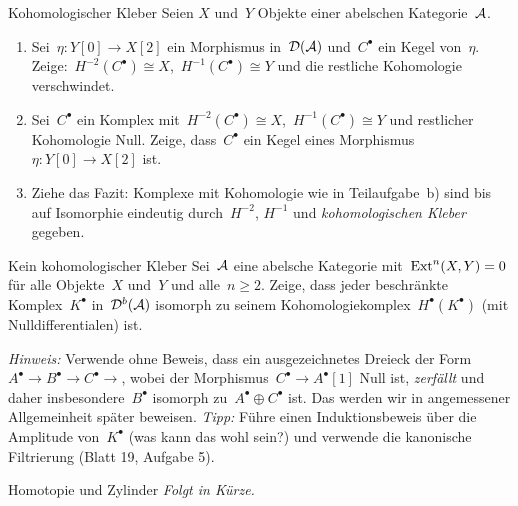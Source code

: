 \documentclass{uebblatt}
\begin{document}
\begin{aufgabe}{Kohomologischer Kleber}
Seien $X$ und~$Y$ Objekte einer abelschen Kategorie~$\mathcal{A}$.
\begin{enumerate}
\item Sei~$\eta : Y[0] \to X[2]$ ein Morphismus in~$\mathcal{D}(\mathcal{A})$ und~$C^\bullet$ ein Kegel
von~$\eta$. \\ Zeige:~$H^{-2}(C^\bullet) \cong X$,~$H^{-1}(C^\bullet)
\cong Y$ und die restliche Kohomologie verschwindet.
\item Sei~$C^\bullet$ ein Komplex mit~$H^{-2}(C^\bullet) \cong
X$,~$H^{-1}(C^\bullet) \cong Y$ und restlicher Kohomologie Null. Zeige, dass~$C^\bullet$
ein Kegel eines Morphismus~$\eta : Y[0] \to X[2]$ ist.
\item Ziehe das Fazit: Komplexe mit Kohomologie wie in Teilaufgabe~b) sind
bis auf Isomorphie eindeutig durch~$H^{-2}$, $H^{-1}$ und \emph{kohomologischen
Kleber} gegeben.
\end{enumerate}
\end{aufgabe}

\begin{aufgabe}{Kein kohomologischer Kleber}
Sei~$\mathcal{A}$ eine abelsche Kategorie mit~$\mathrm{Ext}^n(X,Y) = 0$ für alle Objekte~$X$ und~$Y$
und alle~$n \geq 2$. Zeige, dass jeder beschränkte Komplex~$K^\bullet$
in~$\mathcal{D}^b(\mathcal{A})$ isomorph zu seinem Kohomologiekomplex~$H^\bullet(K^\bullet)$ (mit
Nulldifferentialen) ist.

{\scriptsize \emph{Hinweis:} Verwende ohne Beweis, dass ein ausgezeichnetes
Dreieck der Form~$A^\bullet \to B^\bullet \to C^\bullet \to$, wobei der
Morphismus~$C^\bullet \to A^\bullet[1]$ Null ist, \emph{zerfällt} und daher
insbesondere~$B^\bullet$ isomorph zu~$A^\bullet \oplus C^\bullet$ ist. Das
werden wir in angemessener Allgemeinheit später beweisen.
\emph{Tipp:}
Führe einen Induktionsbeweis über die Amplitude von~$K^\bullet$
(was kann das wohl sein?) und verwende die kanonische Filtrierung (Blatt 19,
Aufgabe 5).\par}
\end{aufgabe}

\begin{aufgabe}{Homotopie und Zylinder}
\emph{Folgt in Kürze.}
\end{aufgabe}
\end{document}
